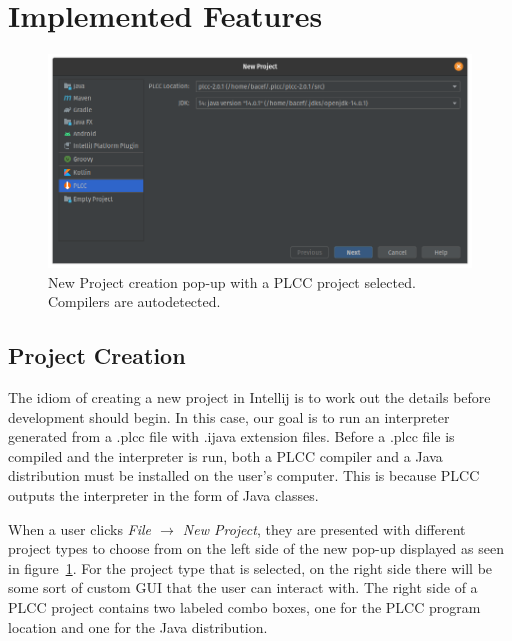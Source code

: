 \documentclass[conference, letterpaper]{IEEEtran}
\begin{document}
\section{Implemented Features}\label{sec:implemented-features}

\begin{figure}[!t]
    \centering
    \includegraphics[width=6in]{proj_config.png}
    \caption{New Project creation pop-up with a PLCC project selected. Compilers are autodetected.}
    \label{fig:proj_config}
\end{figure}

\subsection{Project Creation}\label{subsec:project-creation}
The idiom of creating a new project in Intellij is to work out the details before development should begin.
In this case, our goal is to run an interpreter generated from a .plcc file with .ijava extension files.
Before a .plcc file is compiled and the interpreter is run, both a PLCC compiler and a Java distribution must be installed on the user's computer.
This is because PLCC outputs the interpreter in the form of Java classes.

When a user clicks \textit{File $\rightarrow$ New Project}, they are presented with different project types to choose from on the left side of the new pop-up displayed as seen in figure~\ref{fig:proj_config}.
For the project type that is selected, on the right side there will be some sort of custom GUI that the user can interact with.
The right side of a PLCC project contains two labeled combo boxes, one for the PLCC program location and one for the Java distribution.
\end{document}
